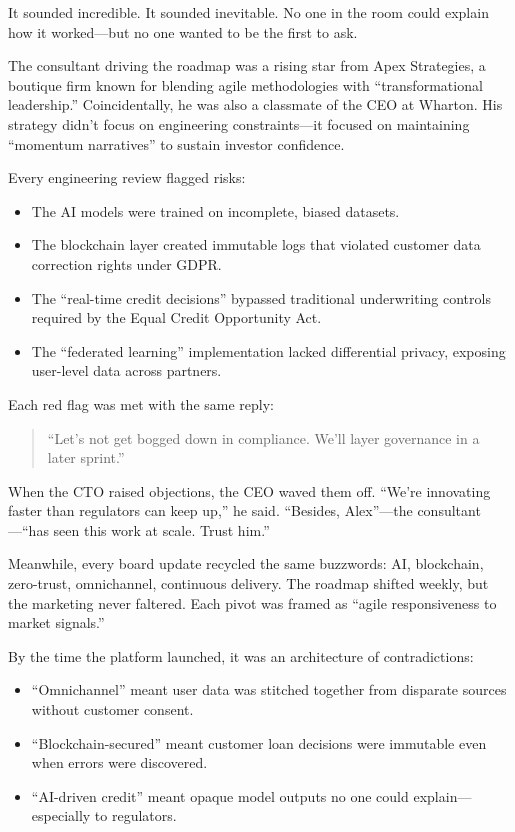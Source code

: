 It sounded incredible. It sounded inevitable.  
No one in the room could explain how it worked—but no one wanted to be the first to ask.

The consultant driving the roadmap was a rising star from Apex Strategies, a boutique firm known for blending agile methodologies with “transformational leadership.” Coincidentally, he was also a classmate of the CEO at Wharton. His strategy didn’t focus on engineering constraints—it focused on maintaining “momentum narratives” to sustain investor confidence.

Every engineering review flagged risks:  

\begin{itemize}
    \item The AI models were trained on incomplete, biased datasets.
    \item The blockchain layer created immutable logs that violated customer data correction rights under GDPR.
    \item The “real-time credit decisions” bypassed traditional underwriting controls required by the Equal Credit Opportunity Act.
    \item The “federated learning” implementation lacked differential privacy, exposing user-level data across partners.
\end{itemize}

Each red flag was met with the same reply:

\begin{quote}
“Let’s not get bogged down in compliance. We’ll layer governance in a later sprint.”
\end{quote}

When the CTO raised objections, the CEO waved them off. “We’re innovating faster than regulators can keep up,” he said. “Besides, Alex”—the consultant—“has seen this work at scale. Trust him.”

Meanwhile, every board update recycled the same buzzwords: AI, blockchain, zero-trust, omnichannel, continuous delivery. The roadmap shifted weekly, but the marketing never faltered. Each pivot was framed as “agile responsiveness to market signals.”

By the time the platform launched, it was an architecture of contradictions:

\begin{itemize}
    \item “Omnichannel” meant user data was stitched together from disparate sources without customer consent.
    \item “Blockchain-secured” meant customer loan decisions were immutable even when errors were discovered.
    \item “AI-driven credit” meant opaque model outputs no one could explain—especially to regulators.
\end{itemize}

